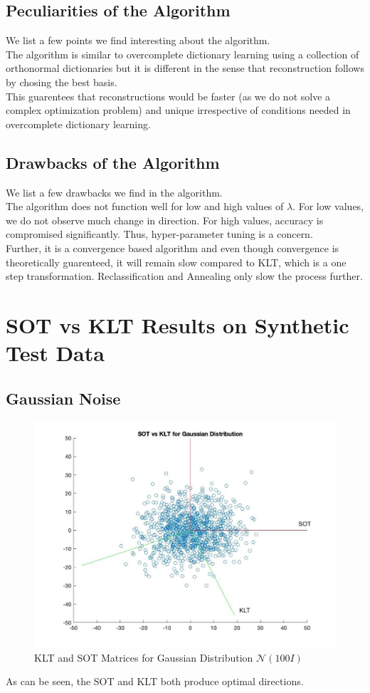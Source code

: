 \documentclass{article}
\theoremstyle{remark}
\begin{document}
\subsection*{Peculiarities of the Algorithm}
We list a few points we find interesting about the algorithm.\\[1mm]
The algorithm is similar to overcomplete dictionary learning using a collection of orthonormal dictionaries but it is different in the sense that reconstruction follows by chosing the best basis.\\
This guarentees that reconstructions would be faster (as we do not solve a complex optimization problem) and unique irrespective of conditions needed in overcomplete dictionary learning.
\subsection*{Drawbacks of the Algorithm}
We list a few drawbacks we find in the algorithm.\\[2mm]
The algorithm does not function well for low and high values of $\lambda$. For low values, we do not observe much change in direction. For high values, accuracy is compromised significantly. Thus, hyper-parameter tuning is a concern.\\[1mm]
Further, it is a convergence based algorithm and even though convergence is theoretically guarenteed, it will remain slow compared to KLT, which is a one step transformation. Reclassification and Annealing only slow the process further.
\newpage

\section*{SOT vs KLT Results on Synthetic Test Data}

\subsection*{Gaussian Noise}
\begin{figure}[H]
\centering\includegraphics[width=0.6\linewidth]{images/gaussian.jpg}
\caption{KLT and SOT Matrices for Gaussian Distribution $\mathcal{N}(100I)$}
\end{figure}
As can be seen, the SOT and KLT both produce optimal directions.
\end{document}
